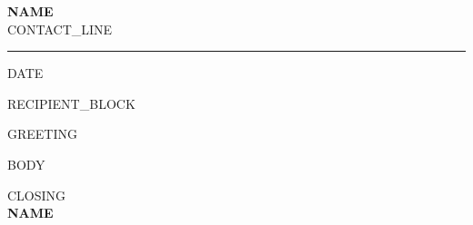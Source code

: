 \documentclass[letterpaper,11pt]{article}
\begin{document}

\begingroup
\setlength{\parskip}{0pt}

\begin{center}
  {\LARGE\bfseries\color{accent} {{NAME}}}\\[3pt]
  {\footnotesize {{CONTACT_LINE}}}
\end{center}

\endgroup

\vspace{4pt}

{\color{darkgray}\hrule}

\vspace{6pt}

\small

{{DATE}}

{{RECIPIENT_BLOCK}}

{{GREETING}}

{{BODY}}

\vspace{4pt}

{{CLOSING}}\\[10pt]

\textbf{{{NAME}}}
\end{document}
